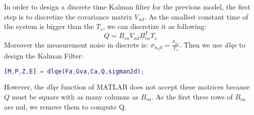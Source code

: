 In order to design a discrete time Kalman filter for the previous model, the first step is to discretize the covariance matrix $V_{nd}$. As the smallest constant time of the system is bigger than the $T_{s}$, we can discretize it as following:
\begin{equation*}
Q = B_{va}V_{nd}B_{va}^T T_s
\end{equation*}
Moreover the measurement noise in discrete is: $\sigma_{n_{2}d} = \frac{\sigma_{n_2}}{T_s}$.
Then we use \emph{dlqe} to design the Kalman Filter:
\begin{lstlisting}[language=Matlab]
[M,P,Z,E] = dlqe(Fa,Gva,Ca,Q,sigman2d);
\end{lstlisting}
However, the \emph{dlqe} function of MATLAB does not accept these matrices because $Q$ must be square with as many columns as $B_{va}$. As the first three rows of $B_{va}$ are nul, we remove them to compute Q.